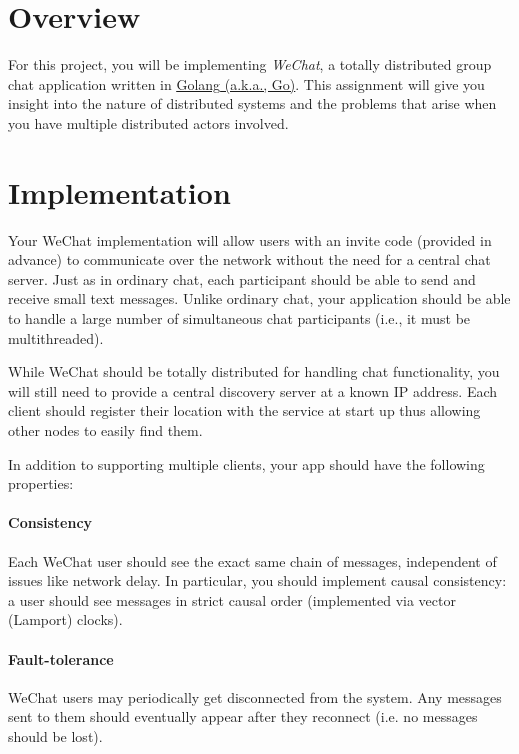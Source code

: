 \documentclass[12pt]{article}
\begin{document}
\maketitle


\section{Overview}
For this project, you will be implementing \emph{WeChat}, a totally distributed group chat application written in \href{https://golang.org/}{\underline{Golang} (a.k.a., Go)}. This assignment will give you insight into the nature of distributed systems and the problems that arise when you have multiple distributed actors involved. 


\section{Implementation}
Your WeChat implementation will allow users with an invite code (provided in advance) to communicate over the network without the need for a central chat server. Just as in ordinary chat, each participant should be able to send and receive small text messages. Unlike ordinary chat, your application should be able to handle a large number of simultaneous chat participants (i.e., it must be multithreaded). 

While WeChat should be totally distributed for handling chat functionality, you will still need to provide a central discovery server at a known IP address. Each client should register their location with the service at start up thus allowing other nodes to easily find them. 

In addition to supporting multiple clients, your app should have the following properties: 

\paragraph{Consistency} 
Each WeChat user should see the exact same chain of messages, independent of issues like network delay. In particular, you should implement causal consistency: a user should see messages in strict causal order (implemented via vector (Lamport) clocks).

\paragraph{Fault-tolerance} 
WeChat users may periodically get disconnected from the system. Any messages sent to them should eventually appear after they reconnect (i.e. no messages should be lost). 
\end{document}
